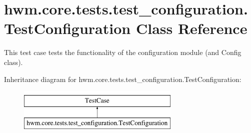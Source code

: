 \hypertarget{classhwm_1_1core_1_1tests_1_1test__configuration_1_1_test_configuration}{\section{hwm.\-core.\-tests.\-test\-\_\-configuration.\-Test\-Configuration Class Reference}
\label{classhwm_1_1core_1_1tests_1_1test__configuration_1_1_test_configuration}
}


This test case tests the functionality of the configuration module (and Config class).  


Inheritance diagram for hwm.\-core.\-tests.\-test\-\_\-configuration.\-Test\-Configuration\-:\begin{figure}[H]
\begin{center}
\leavevmode
\includegraphics[height=2.000000cm]{classhwm_1_1core_1_1tests_1_1test__configuration_1_1_test_configuration}
\end{center}
\end{figure}
